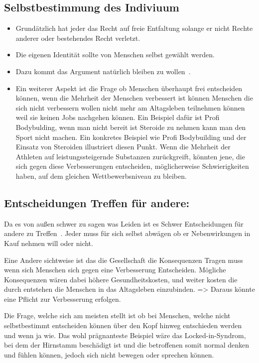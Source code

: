 \documentclass[a4paper,
DIV=13,
12pt,
BCOR=10mm,
department=FakEI,
twoside,
parskip=half,
automark,
]{OTHRartcl}
\begin{document}
\subsection*{Selbstbestimmung des Indiviuum}

\begin{itemize}
    \item Grundätzlich hat jeder das Recht auf freie Entfaltung solange er nicht Rechte anderer oder bestehendes Recht verletzt\cite{fur1996grundgesetz}. 
    \item Die eigenen Identität sollte von Menschen selbst gewählt werden. 
    \item Dazu kommt das Argument natürlich bleiben zu wollen~\cite{lee2016cochlear}.
    \item Ein weiterer Aspekt ist die Frage ob Menschen überhaupt frei entscheiden können, wenn die Mehrheit der Menschen verbessert ist können Menschen die sich nicht verbessern wollen 
    nicht mehr am Altagsleben teilnehmen können weil sie keinen Jobs nachgehen können. Ein Beispiel dafür ist Profi Bodybulding, wenn man nicht bereit ist Steroide zu nehmen kann man
    den Sport nicht machen. Ein konkretes Beispiel wie Profi Bodybuilding und der Einsatz von Steroiden illustriert diesen Punkt. Wenn die Mehrheit der Athleten auf leistungssteigernde 
    Substanzen zurückgreift, könnten jene, die sich gegen diese Verbesserungen entscheiden, möglicherweise Schwierigkeiten haben, auf dem gleichen Wettbewerbsniveau zu bleiben.
\end{itemize}

\subsection*{Entscheidungen Treffen für andere:}
Da es von außen schwer zu sagen was Leiden ist es Schwer Entscheidungen für andere zu Treffen~\cite{plavsienkova2021healthy}. Jeder muss für sich selbst abwägen ob er Nebenwirkungen 
in Kauf nehmen will oder nicht. 

Eine Andere sichtweise ist das die Gesellschaft die Konsequenzen Tragen muss wenn sich Menschen sich gegen eine Verbesserung Entscheiden. Mögliche Konsequenzen wären dabei höhere 
Gesundheitskosten, und weiter kosten die durch entstehen die Menschen in das Altagsleben einzubinden. => Daraus könnte eine Pflicht zur Verbesserung erfolgen.

Die Frage, welche sich am meisten stellt ist ob bei Menschen, welche nicht selbstbestimmt entscheiden können über den Kopf hinweg entschieden werden  und wenn ja wie. Das wohl 
prägnanteste Beispiel wäre das Locked-in-Syndrom, bei dem der Hirnstamm beschädigt ist und die betroffenen somit normal denken und fühlen können, jedoch sich nicht bewegen oder 
sprechen können.~\cite{das2022locked}
\end{document}
